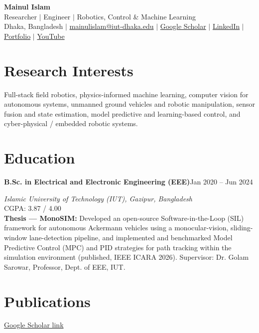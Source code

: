 \documentclass[10.5pt,letterpaper]{article}
\newcommand{\cvitem}[2]{%
  \noindent\textbf{#1}\hfill{#2}\par
}
\begin{document}
\begin{center}
    {\LARGE \textbf{Mainul Islam}}\\[4pt]
    Researcher $\vert$ Engineer $\vert$ Robotics, Control \& Machine Learning\\[4pt]
    Dhaka, Bangladesh \quad $\vert$ \quad
    \href{mailto:mainulislam@iut-dhaka.edu}{mainulislam@iut-dhaka.edu} \quad $\vert$ \quad
    \href{https://scholar.google.com/citations?user=mHfGHugAAAAJ&hl=en}{Google Scholar} \quad $\vert$ \quad
    \href{https://www.linkedin.com/in/mainul-islam-254071205/}{LinkedIn} \quad $\vert$ \quad
    \href{https://mainul-islam-07.github.io/mainulislam.github.io/}{Portfolio} \quad $\vert$ \quad
    \href{https://youtube.com/@mainulislamefan}{YouTube}
\end{center}

\section*{Research Interests}
Full-stack field robotics, physics-informed machine learning, computer vision for autonomous systems, unmanned ground vehicles and robotic manipulation, sensor fusion and state estimation, model predictive and learning-based control, and cyber-physical / embedded robotic systems.

\section*{Education}
\cvitem{B.Sc. in Electrical and Electronic Engineering (EEE)}{Jan 2020 -- Jun 2024}
\textit{Islamic University of Technology (IUT), Gazipur, Bangladesh} \\
CGPA: 3.87 / 4.00 \\
\textbf{Thesis --- MonoSIM:} Developed an open-source Software-in-the-Loop (SIL) framework for autonomous Ackermann vehicles using a monocular-vision, sliding-window lane-detection pipeline, and implemented and benchmarked Model Predictive Control (MPC) and PID strategies for path tracking within the simulation environment (published, IEEE ICARA 2026). Supervisor: Dr. Golam Sarowar, Professor, Dept. of EEE, IUT.

\section*{Publications}
\href{https://scholar.google.com/citations?user=mHfGHugAAAAJ&hl=en}{Google Scholar link}
\end{document}

